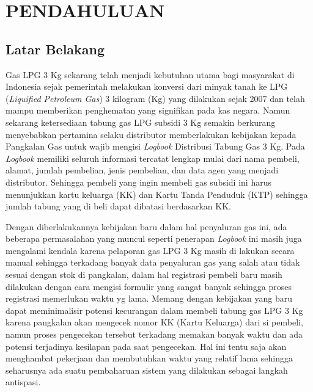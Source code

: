 
\chapter{PENDAHULUAN}

\section{Latar Belakang}
Gas LPG 3 Kg sekarang telah menjadi kebutuhan utama bagi masyarakat di Indonesia sejak pemerintah melakukan konversi dari minyak tanah ke LPG (\textit{Liquified Petroleum Gas}) 3 kilogram (Kg) yang dilakukan sejak 2007 dan telah mampu memberikan penghematan yang signifikan pada kas negara. Namun sekarang ketersediaan tabung gas LPG subsidi 3 Kg semakin berkurang menyebabkan pertamina selaku distributor memberlakukan kebijakan kepada Pangkalan Gas untuk wajib mengisi \textit{Logbook} Distribusi Tabung Gas 3 Kg. Pada \textit{Logbook} memiliki seluruh informasi tercatat lengkap mulai dari nama pembeli, alamat, jumlah pembelian, jenis pembelian, dan data agen yang menjadi distributor. Sehingga  pembeli yang ingin membeli gas subsidi ini harus menunjukkan kartu keluarga (KK) dan Kartu Tanda Penduduk (KTP) sehingga jumlah tabung yang di beli dapat dibatasi berdasarkan KK.
\par Dengan diberlakukannya kebijakan baru dalam hal penyaluran gas ini, ada beberapa permasalahan yang muncul seperti penerapan \textit{Logbook} ini masih juga mengalami kendala karena pelaporan gas LPG 3 Kg masih di lakukan secara manual sehingga terkadang banyak data penyaluran gas yang salah atau tidak sesuai dengan stok di pangkalan, dalam hal registrasi pembeli baru masih dilakukan dengan cara mengisi formulir yang sangat banyak sehingga proses registrasi memerlukan waktu yg lama. Memang dengan kebijakan yang baru dapat meminimalisir potensi kecurangan dalam membeli tabung gas LPG 3 Kg karena pangkalan akan mengecek nomor KK (Kartu Keluarga) dari si pembeli, namun proses pengecekan tersebut terkadang memakan banyak waktu dan ada potensi terjadinya kesilapan pada saat pengecekan.  Hal ini tentu saja akan menghambat pekerjaan dan membutuhkan waktu yang relatif lama sehingga seharusnya ada suatu pembaharuan sistem yang dilakukan sebagai langkah antispasi.
